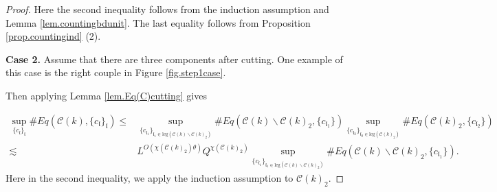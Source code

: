\begin{proof}
Here the second inequality follows from the induction assumption and Lemma \ref{lem.countingbdunit}. The last equality follows from Proposition \ref{prop.countingind} (2).


\textbf{Case 2.} Assume that there are three components after cutting. One example of this case is the right couple in Figure \ref{fig.step1case}.

Then applying Lemma \ref{lem.Eq(C)cutting} gives

\begin{equation}\label{eq.case2expand.threewave}
\begin{split}
    \sup_{\{c_{\mathfrak{l}}\}_{\mathfrak{l}}}\#Eq(\mathcal{C}(k),\{c_{\mathfrak{l}}\}_{\mathfrak{l}})\le&
    \sup_{\{c_{\mathfrak{l}_1}\}_{\mathfrak{l}_1\in \text{leg}(\mathcal{C}(k)\backslash\mathcal{C}(k)_2)} } \# Eq(\mathcal{C}(k)\backslash\mathcal{C}(k)_2,\{c_{\mathfrak{l}_1}\}) \sup_{\{c_{\mathfrak{l}_2}\}_{\mathfrak{l}_2\in \text{leg}(\mathcal{C}(k)_2)} }\# Eq(\mathcal{C}(k)_2, \{c_{\mathfrak{l}_2}\})
    \\
    \lesssim&  L^{O(\chi(\mathcal{C}(k)_2)\theta)} Q^{\chi(\mathcal{C}(k)_2)}\sup_{\{c_{\mathfrak{l}_1}\}_{\mathfrak{l}_1\in \text{leg}(\mathcal{C}(k)\backslash\mathcal{C}(k)_2)} } \# Eq(\mathcal{C}(k)\backslash\mathcal{C}(k)_2,\{c_{\mathfrak{l}_1}\}).
\end{split}
\end{equation}
Here in the second inequality, we apply the induction assumption to $\mathcal{C}(k)_2$.


\end{proof}

